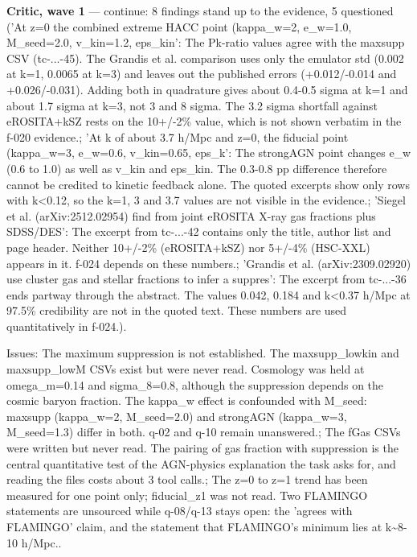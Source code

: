 \documentclass[11pt,a4paper]{article}
\begin{document}
\textbf{Critic, wave 1} --- continue: 8 findings stand up to the evidence, 5 questioned ('At z=0 the combined extreme HACC point (kappa\_w=2, e\_w=1.0, M\_seed=2.0, v\_kin=1.2, eps\_kin': The Pk-ratio values agree with the maxsupp CSV (tc-...-45). The Grandis et al. comparison uses only the emulator std (0.002 at k=1, 0.0065 at k=3) and leaves out the published errors (+0.012/-0.014 and +0.026/-0.031). Adding both in quadrature gives about 0.4-0.5 sigma at k=1 and about 1.7 sigma at k=3, not 3 and 8 sigma. The 3.2 sigma shortfall against eROSITA+kSZ rests on the 10+/-2\% value, which is not shown verbatim in the f-020 evidence.; 'At k of about 3.7 h/Mpc and z=0, the fiducial point (kappa\_w=3, e\_w=0.6, v\_kin=0.65, eps\_k': The strongAGN point changes e\_w (0.6 to 1.0) as well as v\_kin and eps\_kin. The 0.3-0.8 pp difference therefore cannot be credited to kinetic feedback alone. The quoted excerpts show only rows with k\textless{}0.12, so the k=1, 3 and 3.7 values are not visible in the evidence.; 'Siegel et al. (arXiv:2512.02954) find from joint eROSITA X-ray gas fractions plus SDSS/DES': The excerpt from tc-...-42 contains only the title, author list and page header. Neither 10+/-2\% (eROSITA+kSZ) nor 5+/-4\% (HSC-XXL) appears in it. f-024 depends on these numbers.; 'Grandis et al. (arXiv:2309.02920) use cluster gas and stellar fractions to infer a suppres': The excerpt from tc-...-36 ends partway through the abstract. The values 0.042, 0.184 and k\textless{}0.37 h/Mpc at 97.5\% credibility are not in the quoted text. These numbers are used quantitatively in f-024.).

Issues: The maximum suppression is not established. The maxsupp\_lowkin and maxsupp\_lowM CSVs exist but were never read. Cosmology was held at omega\_m=0.14 and sigma\_8=0.8, although the suppression depends on the cosmic baryon fraction. The kappa\_w effect is confounded with M\_seed: maxsupp (kappa\_w=2, M\_seed=2.0) and strongAGN (kappa\_w=3, M\_seed=1.3) differ in both. q-02 and q-10 remain unanswered.; The fGas CSVs were written but never read. The pairing of gas fraction with suppression is the central quantitative test of the AGN-physics explanation the task asks for, and reading the files costs about 3 tool calls.; The z=0 to z=1 trend has been measured for one point only; fiducial\_z1 was not read. Two FLAMINGO statements are unsourced while q-08/q-13 stays open: the 'agrees with FLAMINGO' claim, and the statement that FLAMINGO's minimum lies at k\textasciitilde{}8-10 h/Mpc..
\end{document}
